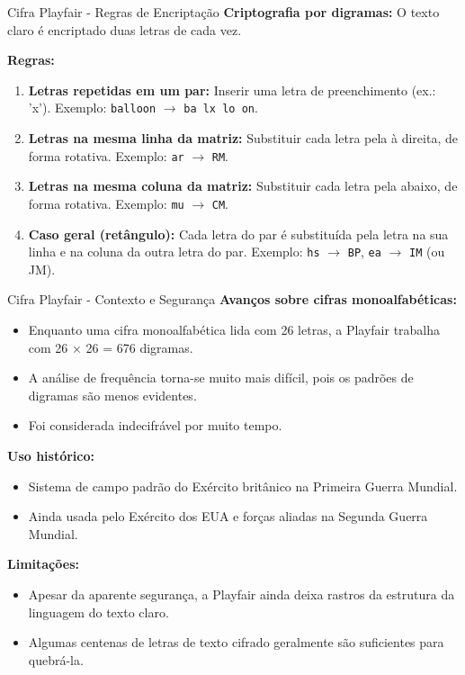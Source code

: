 \begin{frame}{Cifra Playfair - Regras de Encriptação}
\textbf{Criptografia por digramas:} O texto claro é encriptado duas letras de cada vez.

\medskip
\textbf{Regras:}
\begin{enumerate}
    \item \textbf{Letras repetidas em um par:} Inserir uma letra de preenchimento (ex.: 'x').  
    Exemplo: \texttt{balloon} $\rightarrow$ \texttt{ba lx lo on}.
    
    \item \textbf{Letras na mesma linha da matriz:} Substituir cada letra pela à direita, de forma rotativa.  
    Exemplo: \texttt{ar} $\rightarrow$ \texttt{RM}.
    
    \item \textbf{Letras na mesma coluna da matriz:} Substituir cada letra pela abaixo, de forma rotativa.  
    Exemplo: \texttt{mu} $\rightarrow$ \texttt{CM}.
    
    \item \textbf{Caso geral (retângulo):} Cada letra do par é substituída pela letra na sua linha e na coluna da outra letra do par.  
    Exemplo: \texttt{hs} $\rightarrow$ \texttt{BP}, \texttt{ea} $\rightarrow$ \texttt{IM} (ou JM).
\end{enumerate}
\end{frame}

\begin{frame}{Cifra Playfair - Contexto e Segurança}
\textbf{Avanços sobre cifras monoalfabéticas:}
\begin{itemize}
    \item Enquanto uma cifra monoalfabética lida com 26 letras, a Playfair trabalha com 26 × 26 = 676 digramas.
    \item A análise de frequência torna-se muito mais difícil, pois os padrões de digramas são menos evidentes.
    \item Foi considerada indecifrável por muito tempo.
\end{itemize}

\textbf{Uso histórico:}
\begin{itemize}
    \item Sistema de campo padrão do Exército britânico na Primeira Guerra Mundial.
    \item Ainda usada pelo Exército dos EUA e forças aliadas na Segunda Guerra Mundial.
\end{itemize}

\textbf{Limitações:}
\begin{itemize}
    \item Apesar da aparente segurança, a Playfair ainda deixa rastros da estrutura da linguagem do texto claro.
    \item Algumas centenas de letras de texto cifrado geralmente são suficientes para quebrá-la.
\end{itemize}
\end{frame}


